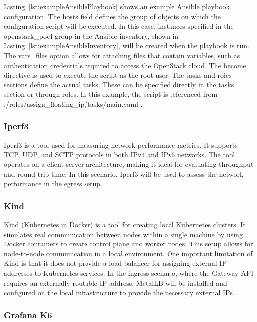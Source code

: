 Listing~\ref{lst:exampleAnsiblePlaybook} shows an example Ansible playbook configuration. The hosts field defines the group of objects on which the configuration script will be executed. In this case, instances specified in the openstack\_pool group in the Ansible inventory, shown in Listing~\ref{lst:exampleAnsibleInventory}, will be created when the playbook is run. The vars\_files option allows for attaching files that contain variables, such as authentication credentials required to access the OpenStack cloud. The become directive is used to execute the script as the root user. The tasks and roles sections define the actual tasks. These can be specified directly in the tasks section or through roles. In this example, the script is referenced from ./roles/assign\_floating\_ip/tasks/main.yaml \cite{AnsiblePlaybook}.


\subsubsection{Iperf3}
\label{sec:iperf3}

Iperf3 is a tool used for measuring network performance metrics. It supports TCP, UDP, and SCTP protocols in both IPv4 and IPv6 networks. The tool operates on a client-server architecture, making it ideal for evaluating throughput and round-trip time. In this scenario, Iperf3 will be used to assess the network performance in the egress setup.

\subsubsection{Kind}
\label{sec:kind}

Kind (Kubernetes in Docker) is a tool for creating local Kubernetes clusters. It simulates real communication between nodes within a single machine by using Docker containers to create control plane and worker nodes. This setup allows for node-to-node communication in a local environment. One important limitation of Kind is that it does not provide a load balancer for assigning external IP addresses to Kubernetes services. In the ingress scenario, where the Gateway API requires an externally routable IP address, MetalLB will be installed and configured on the local infrastructure to provide the necessary external IPs \cite{Kind}.

\subsubsection{Grafana K6}
\label{sec:grafana}

